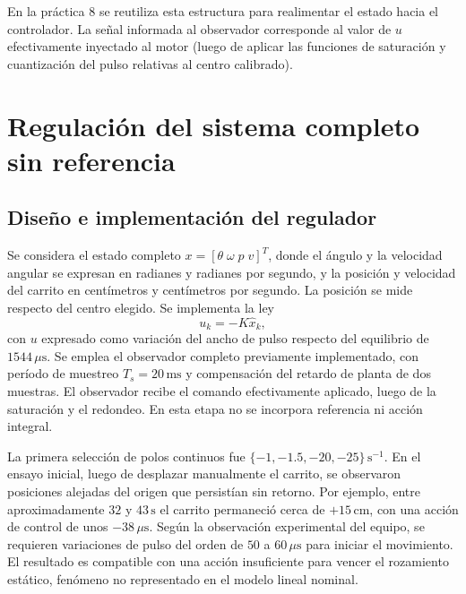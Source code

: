 \documentclass[a4paper, twoside, 10pt, spanish]{article}
\numberwithin{table}{section}
\begin{document}
En la práctica 8 se reutiliza esta estructura para realimentar el estado hacia el controlador. La señal informada al observador corresponde al valor de $u$ efectivamente inyectado al motor (luego de aplicar las funciones de saturación y cuantización del pulso relativas al centro calibrado).

\section{Regulación del sistema completo sin referencia}
\label{sec:regulacion-sin-referencia}

\subsection{Diseño e implementación del regulador}
Se considera el estado completo $x = [\theta\;\omega\;p\;v]^T$, donde el ángulo y la velocidad angular se expresan en radianes y radianes por segundo, y la posición y velocidad del carrito en centímetros y centímetros por segundo. La posición se mide respecto del centro elegido. Se implementa la ley
\begin{equation}
    u_k = -K\hat{x}_k,
\end{equation}
con $u$ expresado como variación del ancho de pulso respecto del equilibrio de $1544\,\mu\mathrm{s}$. Se emplea el observador completo previamente implementado, con período de muestreo $T_s = 20\,\mathrm{ms}$ y compensación del retardo de planta de dos muestras. El observador recibe el comando efectivamente aplicado, luego de la saturación y el redondeo. En esta etapa no se incorpora referencia ni acción integral.

La primera selección de polos continuos fue $\{-1,-1.5,-20,-25\}\,\mathrm{s}^{-1}$. En el ensayo inicial, luego de desplazar manualmente el carrito, se observaron posiciones alejadas del origen que persistían sin retorno. Por ejemplo, entre aproximadamente $32$ y $43\,\mathrm{s}$ el carrito permaneció cerca de $+15\,\mathrm{cm}$, con una acción de control de unos $-38\,\mu\mathrm{s}$. Según la observación experimental del equipo, se requieren variaciones de pulso del orden de $50$ a $60\,\mu\mathrm{s}$ para iniciar el movimiento. El resultado es compatible con una acción insuficiente para vencer el rozamiento estático, fenómeno no representado en el modelo lineal nominal.
\end{document}
